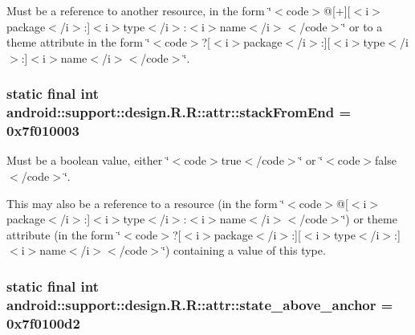 Must be a reference to another resource, in the form \char`\"{}$<$code$>$@\mbox{[}+\mbox{]}\mbox{[}$<$i$>$package$<$/i$>$:\mbox{]}$<$i$>$type$<$/i$>$:$<$i$>$name$<$/i$>$$<$/code$>$\char`\"{} or to a theme attribute in the form \char`\"{}$<$code$>$?\mbox{[}$<$i$>$package$<$/i$>$:\mbox{]}\mbox{[}$<$i$>$type$<$/i$>$:\mbox{]}$<$i$>$name$<$/i$>$$<$/code$>$\char`\"{}. \hypertarget{classandroid_1_1support_1_1design_1_1_r_1_1attr_5104b425aaa506d36bc8cc88c4e6dbba}{
\subsubsection[{stackFromEnd}]{\setlength{\rightskip}{0pt plus 5cm}static final int android::support::design.R.R::attr::stackFromEnd = 0x7f010003}}
\label{classandroid_1_1support_1_1design_1_1_r_1_1attr_5104b425aaa506d36bc8cc88c4e6dbba}


Must be a boolean value, either \char`\"{}$<$code$>$true$<$/code$>$\char`\"{} or \char`\"{}$<$code$>$false$<$/code$>$\char`\"{}. 

This may also be a reference to a resource (in the form \char`\"{}$<$code$>$@\mbox{[}$<$i$>$package$<$/i$>$:\mbox{]}$<$i$>$type$<$/i$>$:$<$i$>$name$<$/i$>$$<$/code$>$\char`\"{}) or theme attribute (in the form \char`\"{}$<$code$>$?\mbox{[}$<$i$>$package$<$/i$>$:\mbox{]}\mbox{[}$<$i$>$type$<$/i$>$:\mbox{]}$<$i$>$name$<$/i$>$$<$/code$>$\char`\"{}) containing a value of this type. \hypertarget{classandroid_1_1support_1_1design_1_1_r_1_1attr_68027aec729bb3140dab84e0d3b172a2}{
\subsubsection[{state\_\-above\_\-anchor}]{\setlength{\rightskip}{0pt plus 5cm}static final int android::support::design.R.R::attr::state\_\-above\_\-anchor = 0x7f0100d2}}
\label{classandroid_1_1support_1_1design_1_1_r_1_1attr_68027aec729bb3140dab84e0d3b172a2}



